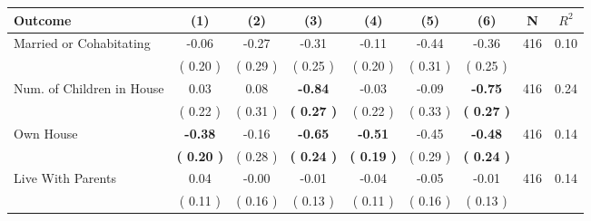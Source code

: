 \begin{tabular}{lcccccccc}
\toprule
 \textbf{Outcome} & \textbf{(1)} & \textbf{(2)} & \textbf{(3)} & \textbf{(4)} & \textbf{(5)} & \textbf{(6)} & \textbf{N} & \textbf{$ R^2$} \\
\midrule
Married or Cohabitating &     -0.06 &     -0.27 &     -0.31 &     -0.11 &     -0.44 &     -0.36 & 416 &       0.10 \\ 
 & (     0.20 ) & (     0.29 ) & (     0.25 ) & (     0.20 ) & (     0.31 ) & (     0.25 ) & \\
Num. of Children in House &      0.03 &      0.08 & \textbf{    -0.84} &     -0.03 &     -0.09 & \textbf{    -0.75} & 416 &       0.24 \\ 
 & (     0.22 ) & (     0.31 ) & \textbf{(     0.27 )} & (     0.22 ) & (     0.33 ) & \textbf{(     0.27 )} & \\
Own House & \textbf{    -0.38} &     -0.16 & \textbf{    -0.65} & \textbf{    -0.51} &     -0.45 & \textbf{    -0.48} & 416 &       0.14 \\ 
 & \textbf{(     0.20 )} & (     0.28 ) & \textbf{(     0.24 )} & \textbf{(     0.19 )} & (     0.29 ) & \textbf{(     0.24 )} & \\
Live With Parents &      0.04 &     -0.00 &     -0.01 &     -0.04 &     -0.05 &     -0.01 & 416 &       0.14 \\ 
 & (     0.11 ) & (     0.16 ) & (     0.13 ) & (     0.11 ) & (     0.16 ) & (     0.13 ) & \\
\bottomrule
\end{tabular}
